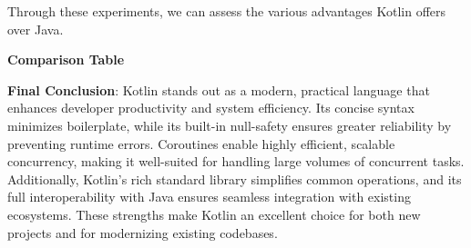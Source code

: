 Through these experiments, we can assess the various advantages Kotlin offers over Java. 
\vspace{1em}

\noindent \textbf{Comparison Table}

\vspace{1em}

\begin{table}[ht]
\centering
{}
\caption{Comparison of Kotlin and Java}
\label{tab:comparison}
\end{table}


\vspace{1em}

\noindent \textbf{Final Conclusion}: Kotlin stands out as a modern, practical language that enhances developer productivity and system efficiency. Its concise syntax minimizes boilerplate, while its built-in null-safety ensures greater reliability by preventing runtime errors. Coroutines enable highly efficient, scalable concurrency, making it well-suited for handling large volumes of concurrent tasks. Additionally, Kotlin’s rich standard library simplifies common operations, and its full interoperability with Java ensures seamless integration with existing ecosystems. These strengths make Kotlin an excellent choice for both new projects and for modernizing existing codebases.




